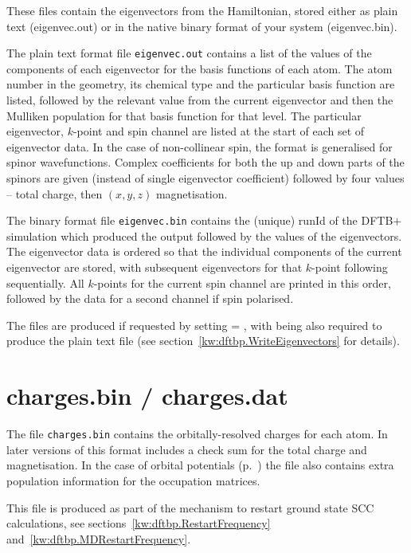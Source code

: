 These files contain the eigenvectors from the Hamiltonian, stored
either as plain text (eigenvec.out) or in the native binary format of
your system (eigenvec.bin).

The plain text format file \verb|eigenvec.out| contains a list of the values of
the components of each eigenvector for the basis functions of each atom. The
atom number in the geometry, its chemical type and the particular basis function
are listed, followed by the relevant value from the current eigenvector and then
the Mulliken population for that basis function for that level. The particular eigenvector, $k$-point and spin
channel are listed at the start of each set of eigenvector data. In the case of
non-collinear spin, the format is generalised for spinor wavefunctions. Complex
coefficients for both the up and down parts of the spinors are given (instead of
single eigenvector coefficient) followed by four values -- total charge, then
$(x,y,z)$ magnetisation.

The binary format file \verb|eigenvec.bin| contains the (unique) runId of the
DFTB+ simulation which produced the output followed by the values of the
eigenvectors. The eigenvector data is ordered so that the individual components
of the current eigenvector are stored, with subsequent eigenvectors for that
$k$-point following sequentially. All $k$-points for the current spin channel
are printed in this order, followed by the data for a second channel if spin
polarised.

The files are produced if requested by setting  =
, with  being also required to produce the plain
text file (see section~\ref{kw:dftbp.WriteEigenvectors} for details).

\section{charges.bin / charges.dat}
\label{sec:charges.bin}

The file \verb|charges.bin| contains the orbitally-resolved charges for each
atom. In later versions of \dftbp{} this format includes a check sum for the
total charge and magnetisation. In the case of orbital potentials
(p.~) the file also contains extra population information for
the occupation matrices.

This file is produced as part of the mechanism to restart ground state SCC
calculations, see sections~\ref{kw:dftbp.RestartFrequency}
and~\ref{kw:dftbp.MDRestartFrequency}.

